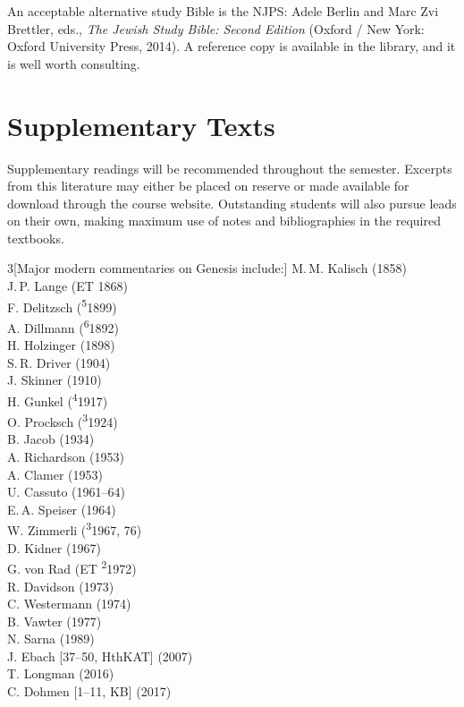 \documentclass[titlepage]{article}
\begin{document}
An acceptable alternative study Bible is the NJPS: Adele Berlin and Marc
Zvi Brettler, eds., \emph{The Jewish Study Bible: Second Edition}
(Oxford / New York: Oxford University Press, 2014). A reference copy is
available in the library, and it is well worth consulting.

\section{Supplementary Texts}
\label{supplementary}

Supplementary readings will be recommended throughout the semester.
Excerpts from this literature may either be placed on reserve or made
available for download through the course website. Outstanding students
will also pursue leads on their own, making maximum use of notes and
bibliographies in the required textbooks.

\begin{multicols}{3}[Major modern commentaries on Genesis include:]%
\footnotesize\noindent
M.\,M. Kalisch (1858)\\
J.\,P. Lange (ET 1868)\\
F. Delitzsch (\textsuperscript{5}1899)\\
A. Dillmann (\textsuperscript{6}1892)\\
H. Holzinger (1898)\\
S.\,R. Driver (1904)\\
J. Skinner (1910)\\
H. Gunkel (\textsuperscript{4}1917)\\
O. Procksch (\textsuperscript{3}1924)\\
B. Jacob (1934)\\
A. Richardson (1953)\\
A. Clamer (1953)\\
U. Cassuto (1961--64)\\
E.\,A. Speiser (1964)\\
W. Zimmerli (\textsuperscript{3}1967, 76)\\
D. Kidner (1967)\\
G. von Rad (ET \textsuperscript{2}1972)\\
R. Davidson (1973)\\
C. Westermann (1974)\\
B. Vawter (1977)\\
N. Sarna (1989)\\
J. Ebach [37--50, HthKAT] (2007)\\
T. Longman (2016)\\
C. Dohmen [1--11, KB] (2017)
\end{multicols}
\end{document}
